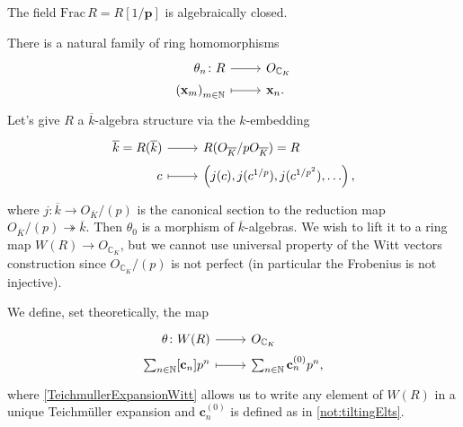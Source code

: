 \begin{thm}
	The field $\mathrm{Frac}\, R = R[1/\mathbf{p}]$ is algebraically closed.
\end{thm}


\begin{rem}[]
	There is a natural family of ring homomorphisms
	\begin{equation*}
	\begin{tikzcd}[row sep = 0ex
		,/tikz/column 1/.append style={anchor=base east}
		,/tikz/column 2/.append style={anchor=base west}]
		\theta_n\colon R \arrow[r, "", rightarrow] &
		O_{\mathbb{C}_K} \\
		\left( \mathbf{x}_m \right)_{m \in \mathbb{N}} \arrow[r, "", mapsto] & 
		\mathbf{x}_n
	.\end{tikzcd}
	\end{equation*} 
	Let's give $R$ a $\overline{k}$-algebra structure
	via the $k$-embedding
	\begin{equation*}
	\begin{tikzcd}[row sep = 0ex
		,/tikz/column 1/.append style={anchor=base east}
		,/tikz/column 2/.append style={anchor=base west}]
		\overline{k} = R(\overline{k}) \arrow[r, "", rightarrow] &
		R(O_{\overline{K}}/pO_{\overline{K}}) =R\\
		c \arrow[r, "", mapsto] & 
		\left( j(c), j(c^{1/p}), j(c^{1/p^2}), \ldots \right)
	,\end{tikzcd}
	\end{equation*} 
	where $j\colon \overline{k} \to O_{\overline{K}}/ (p)$ is the canonical
	section to the reduction map $O_{\overline{K}}/ (p) \twoheadrightarrow \overline{k}$.
	Then $\theta_0$ is a morphism of $\overline{k}$-algebras.
	We wish to lift it to a ring map $W(R) \to O_{\mathbb{C}_K}$,
	but we cannot use universal property of the Witt vectors construction
	since $O_{\mathbb{C}_K}/ (p)$ is not perfect (in particular the Frobenius
	is not injective).
\end{rem}


\begin{defn}[]
	We define, set theoretically, the map
	\begin{equation*}
	\begin{tikzcd}[row sep = 0ex
		,/tikz/column 1/.append style={anchor=base east}
		,/tikz/column 2/.append style={anchor=base west}]
		\theta\colon W(R) \arrow[r, "", rightarrow] &
		O_{\mathbb{C}_K} \\
		\sum_{n \in \mathbb{N} }^{  } [\mathbf{c}_n] p^n \arrow[r, "", mapsto] & 
		\sum_{n \in \mathbb{N} }^{  } \mathbf{c}_n^{(0)} p^n
	,\end{tikzcd}
	\end{equation*} 
	where \cref{TeichmullerExpansionWitt} allows us to write any element of $W(R)$
	in a unique Teichmüller expansion and $\mathbf{c}_n^{(0)}$ is defined as in \cref{not:tiltingElts}.
\end{defn}


